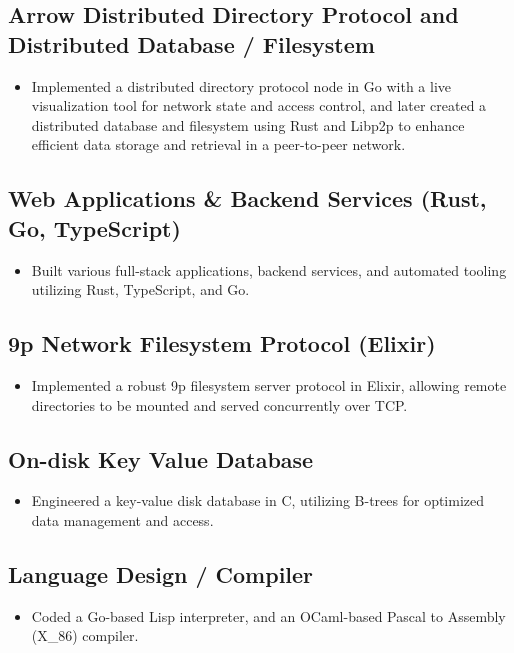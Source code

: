 \documentclass[a4paper, 12pt]{article}
\begin{document}
\subsection{Arrow Distributed Directory Protocol and Distributed Database / Filesystem}
\begin{itemize}
\item Implemented a distributed directory protocol node in Go with a live visualization tool for network state and access control, and later created a distributed database and filesystem using Rust and Libp2p to enhance efficient data storage and retrieval in a peer-to-peer network.
\end{itemize}

\subsection{Web Applications \& Backend Services (Rust, Go, TypeScript)}
\begin{itemize}
\item Built various full-stack applications, backend services, and automated tooling utilizing Rust, TypeScript, and Go.
\end{itemize}

\subsection{9p Network Filesystem Protocol (Elixir)}
\begin{itemize}
  \item Implemented a robust 9p filesystem server protocol in Elixir, allowing remote directories to be mounted and served concurrently over TCP.
\end{itemize}

\subsection{On-disk Key Value Database}
\begin{itemize}
  \item Engineered a key-value disk database in C, utilizing B-trees for optimized data management and access.
\end{itemize}

\subsection{Language Design / Compiler}
\begin{itemize}
  \item Coded a Go-based Lisp interpreter, and an OCaml-based Pascal to Assembly (X\_86) compiler.
\end{itemize}
\end{document}
